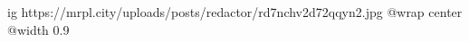  
 
 
 
 

\ifcmt
  ig https://mrpl.city/uploads/posts/redactor/rd7nchv2d72qqyn2.jpg
  @wrap center
  @width 0.9
\fi
